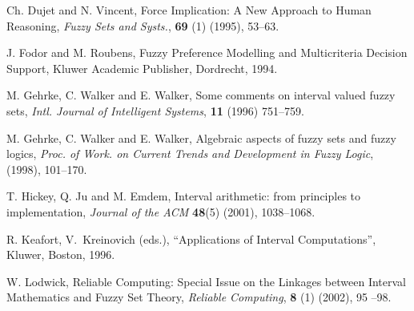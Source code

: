 \documentclass[12pt]{article}
\theoremstyle{plain}
\theoremstyle{remark}
\theoremstyle{definition}
\theoremstyle{proposition}
\begin{document}
\begin{thebibliography}{8}
{  Ch. Dujet and N. Vincent, Force Implication: {A} New Approach to Human Reasoning,
\emph{Fuzzy Sets and Systs.}, \textbf{69} (1) (1995),
53--63.

%
 J. Fodor and M. Roubens, Fuzzy Preference Modelling and Multicriteria Decision Support, Kluwer Academic Publisher, Dordrecht, 1994.


%

M. Gehrke, C. Walker and E. Walker, Some comments on interval
valued fuzzy sets, \emph{Intl. Journal of Intelligent Systems},
\textbf{11} (1996) 751--759.

M. Gehrke, C. Walker  and  E. Walker, Algebraic aspects of fuzzy
sets and fuzzy logics, \emph{Proc. of Work. on Current Trends and
Development in Fuzzy Logic}, (1998), 101--170.

 T. Hickey, Q. Ju and M. Emdem, Interval arithmetic: from principles to implementation,
\emph{Journal of the {ACM}} \textbf{48}(5) (2001), 1038--1068.

 R. Keafort,  V.~Kreinovich (eds.), ``Applications of Interval Computations'',
Kluwer, Boston, 1996.



%
W. Lodwick, Reliable Computing: Special Issue on the Linkages
between Interval Mathematics and Fuzzy Set Theory, \emph{Reliable
Computing}, {\bf 8} (1) (2002), 95 --98.

}
\end{thebibliography}
\end{document}
